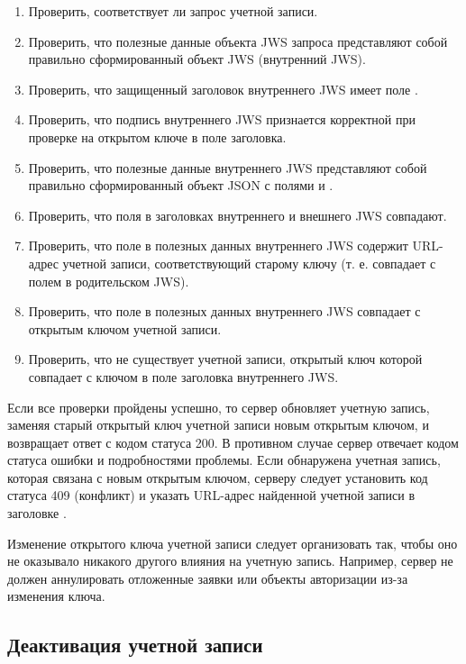 \begin{enumerate}
\item 
Проверить, соответствует ли запрос учетной записи.
\item 
Проверить, что полезные данные объекта JWS запроса представляют собой правильно 
сформированный объект JWS (внутренний JWS).  
\item 
Проверить, что защищенный заголовок внутреннего JWS имеет поле .
\item
Проверить, что подпись внутреннего JWS признается корректной при проверке на открытом
ключе в поле  заголовка.  
\item 
Проверить, что полезные данные внутреннего JWS представляют собой 
правильно сформированный объект JSON с полями  и .
\item 
Проверить, что поля  в заголовках внутреннего и внешнего JWS 
совпадают.
\item
Проверить, что поле  в полезных данных внутреннего JWS
содержит URL-адрес учетной записи, соответствующий старому ключу 
(т. е. совпадает с полем  в родительском JWS). 
\item
Проверить, что поле  в полезных данных внутреннего JWS
совпадает с открытым ключом учетной записи.
\item 
Проверить, что не существует учетной записи, открытый ключ которой совпадает с  
ключом в поле  заголовка внутреннего JWS.  
\end{enumerate}

Если все проверки пройдены успешно, то сервер обновляет учетную запись, заменяя 
старый открытый ключ учетной записи новым открытым ключом, и возвращает  
ответ с кодом статуса 200. 
%
В противном случае сервер отвечает кодом статуса ошибки и подробностями 
проблемы. 
%
Если обнаружена учетная запись, которая связана с новым открытым ключом, 
серверу следует установить код статуса 409 (конфликт) и указать URL-адрес 
найденной учетной записи в заголовке .

Изменение открытого ключа учетной записи следует организовать так, чтобы
оно не оказывало никакого другого влияния на учетную запись. 
Например, сервер не должен аннулировать отложенные заявки или объекты
авторизации из-за изменения ключа. 

\subsection{Деактивация учетной записи}\label{ACME.Account.Deact}

